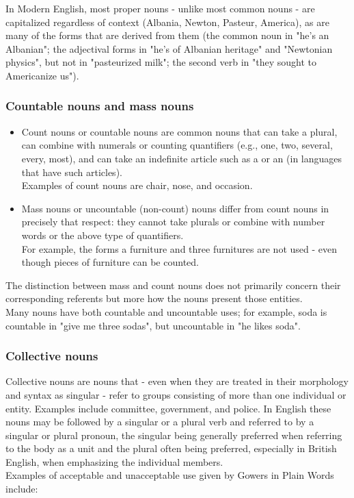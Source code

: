 In Modern English, most proper nouns - unlike most common nouns - are capitalized regardless of context (Albania, Newton, Pasteur, America), as are many of the forms that are derived from them (the common noun in "he's an Albanian"; the adjectival forms in "he's of Albanian heritage" and "Newtonian physics", but not in "pasteurized milk"; the second verb in "they sought to Americanize us").


\subsubsection{Countable nouns and mass nouns \cite{wiki-noun}}
\begin{itemize}
    \item Count nouns or countable nouns are common nouns that can take a plural, can combine with numerals or counting quantifiers (e.g., one, two, several, every, most), and can take an indefinite article such as a or an (in languages that have such articles). \\ Examples of count nouns are chair, nose, and occasion.
    \item Mass nouns or uncountable (non-count) nouns differ from count nouns in precisely that respect: they cannot take plurals or combine with number words or the above type of quantifiers. \\
    For example, the forms a furniture and three furnitures are not used - even though pieces of furniture can be counted. 
\end{itemize}

The distinction between mass and count nouns does not primarily concern their corresponding referents but more how the nouns present those entities.\\
Many nouns have both countable and uncountable uses; for example, soda is countable in "give me three sodas", but uncountable in "he likes soda".


\subsubsection{Collective nouns \cite{wiki-noun}}
Collective nouns are nouns that - even when they are treated in their morphology and syntax as singular - refer to groups consisting of more than one individual or entity. Examples include committee, government, and police. In English these nouns may be followed by a singular or a plural verb and referred to by a singular or plural pronoun, the singular being generally preferred when referring to the body as a unit and the plural often being preferred, especially in British English, when emphasizing the individual members. \\Examples of acceptable and unacceptable use given by Gowers in Plain Words include:

